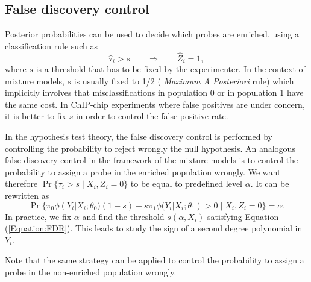 \documentclass{llncs}
\begin{document}
\subsection{False discovery control}
Posterior probabilities can be used to decide which probes are
enriched, using a classification rule such as
$$
\hat{\tau}_{i} > s \qquad \Rightarrow \qquad
\hat{Z}_i =1,
$$
where $s$ is a threshold that has to be fixed by the experimenter.
In the context of mixture models, $s$ is usually fixed to 1/2 ({\it
  Maximum A Posteriori} rule) which implicitly involves that
misclassifications in population 0 or in population 1 have the same
cost. In ChIP-chip experiments where false positives are under
concern, it is better to fix $s$ in order to control the false
positive rate.

In the hypothesis test theory, the false discovery control is
performed by controlling the probability to reject wrongly the null
hypothesis. An analogous false discovery control in the framework of
the mixture models is to control the probability to assign a probe
in the enriched population wrongly. We want therefore $\Pr\{\tau_{i}
> s \;|\; X_i, Z_i =0\}$ to be equal to predefined level $\alpha$.
It can be rewritten as
\begin{equation}
\Pr\{ \pi_0 \phi(Y_i|X_i; \theta_0) (1-s) - s \pi_1 \phi(Y_i|X_i;
\theta_1) > 0 \;|\; X_i, Z_i =0\}  =  \alpha.
\label{Equation:FDR}
\end{equation}
In practice, we fix $\alpha$ and find the threshold $s(\alpha, X_i)$
satisfying Equation (\ref{Equation:FDR}).  This leads to study the
sign of a second degree polynomial in $Y_i$.

Note that the same strategy can be applied to control the probability
to assign a probe in the non-enriched population wrongly.
\end{document}
